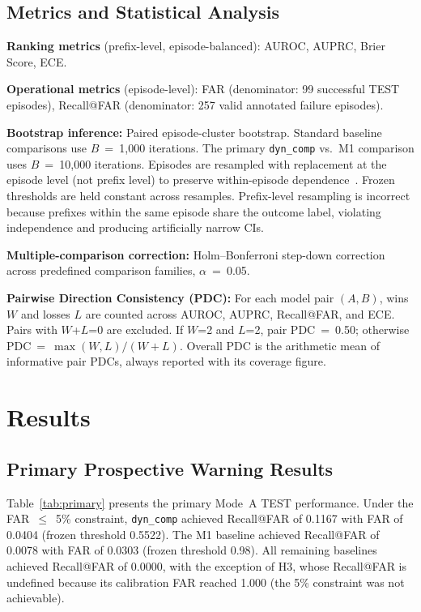 \documentclass[conference]{IEEEtran}
\begin{document}
\subsection{Metrics and Statistical Analysis}

\textbf{Ranking metrics} (prefix-level, episode-balanced): AUROC, AUPRC,
Brier Score, ECE.

\textbf{Operational metrics} (episode-level): FAR (denominator: 99
successful TEST episodes), Recall@FAR (denominator: 257 valid annotated
failure episodes).

\textbf{Bootstrap inference:} Paired episode-cluster bootstrap. Standard
baseline comparisons use $B$~=~1{,}000 iterations. The primary
\texttt{dyn\_comp} vs.\ M1 comparison uses $B$~=~10{,}000 iterations.
Episodes are resampled with replacement at the episode level (not prefix
level) to preserve within-episode dependence~\cite{b12}. Frozen
thresholds are held constant across resamples. Prefix-level resampling
is incorrect because prefixes within the same episode share the outcome
label, violating independence and producing artificially narrow CIs.

\textbf{Multiple-comparison correction:} Holm--Bonferroni step-down
correction~\cite{b13} across predefined comparison families,
$\alpha$~=~0.05.

\textbf{Pairwise Direction Consistency (PDC):} For each model pair
$(A,B)$, wins $W$ and losses $L$ are counted across AUROC, AUPRC,
Recall@FAR, and ECE. Pairs with $W$+$L$=0 are excluded. If $W$=2 and
$L$=2, pair PDC~=~0.50; otherwise PDC~=~$\max(W,L)/(W+L)$. Overall PDC
is the arithmetic mean of informative pair PDCs, always reported with
its coverage figure.

\section{Results}

\subsection{Primary Prospective Warning Results}

Table~\ref{tab:primary} presents the primary Mode~A TEST performance.
Under the FAR~$\leq$~5\% constraint, \texttt{dyn\_comp} achieved
Recall@FAR of 0.1167 with FAR of 0.0404 (frozen threshold 0.5522).
The M1 baseline achieved Recall@FAR of 0.0078 with FAR of
0.0303 (frozen threshold 0.98). All remaining baselines achieved
Recall@FAR of 0.0000, with the exception of H3, whose Recall@FAR is
undefined because its calibration FAR reached 1.000 (the 5\% constraint
was not achievable).
\end{document}
